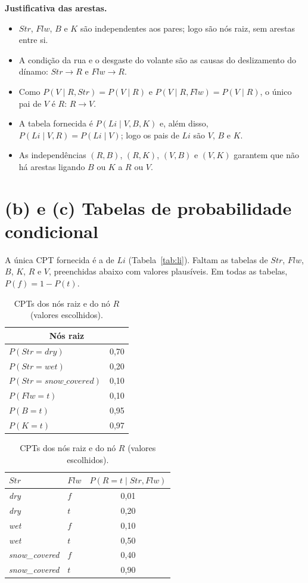 \documentclass[12pt,a4paper]{article}
\newcommand{\Str}{\mathit{Str}}
\newcommand{\Flw}{\mathit{Flw}}
\newcommand{\Li}{\mathit{Li}}
\newcommand{\snow}{\mathit{snow\_covered}}
\begin{document}
\noindent\textbf{Justificativa das arestas.}
\begin{itemize}
  \item $\Str$, $\Flw$, $B$ e $K$ são independentes aos pares; logo são nós raiz, sem
        arestas entre si.
  \item A condição da rua e o desgaste do volante são as causas do deslizamento do
        dínamo: $\Str \to R$ e $\Flw \to R$.
  \item Como $P(V \mid R, \Str) = P(V \mid R)$ e $P(V \mid R, \Flw) = P(V \mid R)$, o
        único pai de $V$ é $R$: $R \to V$.
  \item A tabela fornecida é $P(\Li \mid V, B, K)$ e, além disso,
        $P(\Li \mid V, R) = P(\Li \mid V)$; logo os pais de $\Li$ são $V$, $B$ e $K$.
  \item As independências $(R,B)$, $(R,K)$, $(V,B)$ e $(V,K)$ garantem que não há
        arestas ligando $B$ ou $K$ a $R$ ou $V$.
\end{itemize}

\section*{(b) e (c) Tabelas de probabilidade condicional}

A única CPT fornecida é a de $\Li$ (Tabela~\ref{tab:li}). Faltam as tabelas de
$\Str$, $\Flw$, $B$, $K$, $R$ e $V$, preenchidas abaixo com valores plausíveis.
Em todas as tabelas, $P(f) = 1 - P(t)$.

\begin{table}[H]
\centering
\begin{tabular}{lc}
\toprule
\multicolumn{2}{c}{Nós raiz} \\
\midrule
$P(\Str = \mathit{dry})$   & 0,70 \\
$P(\Str = \mathit{wet})$   & 0,20 \\
$P(\Str = \snow)$          & 0,10 \\
\midrule
$P(\Flw = t)$              & 0,10 \\
$P(B = t)$                 & 0,95 \\
$P(K = t)$                 & 0,97 \\
\bottomrule
\end{tabular}
\qquad
\begin{tabular}{llc}
\toprule
$\Str$ & $\Flw$ & $P(R = t \mid \Str, \Flw)$ \\
\midrule
\textit{dry}           & $f$ & 0,01 \\
\textit{dry}           & $t$ & 0,20 \\
\textit{wet}           & $f$ & 0,10 \\
\textit{wet}           & $t$ & 0,50 \\
\textit{snow\_covered} & $f$ & 0,40 \\
\textit{snow\_covered} & $t$ & 0,90 \\
\bottomrule
\end{tabular}
\caption{CPTs dos nós raiz e do nó $R$ (valores escolhidos).}
\end{table}
\end{document}
